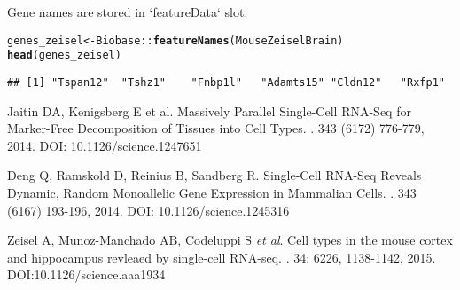 \documentclass[12pt]{article}\usepackage[]{graphicx}\usepackage[usenames,dvipsnames]{color}
\makeatletter
\newcommand{\hlopt}[1]{\textcolor[rgb]{0,0,0}{#1}}%
\newcommand{\hlstd}[1]{\textcolor[rgb]{0.345,0.345,0.345}{#1}}%
\newcommand{\hlkwb}[1]{\textcolor[rgb]{0.69,0.353,0.396}{#1}}%
\newcommand{\hlkwd}[1]{\textcolor[rgb]{0.737,0.353,0.396}{\textbf{#1}}}%
\newenvironment{kframe}{%
 \def\at@end@of@kframe{}%
 \ifinner\ifhmode%
  \def\at@end@of@kframe{\end{minipage}}%
  \begin{minipage}{\columnwidth}%
 \fi\fi%
 \def\FrameCommand##1{\hskip\@totalleftmargin \hskip-\fboxsep
 \colorbox{shadecolor}{##1}\hskip-\fboxsep
     \hskip-\linewidth \hskip-\@totalleftmargin \hskip\columnwidth}%
 \MakeFramed {\advance\hsize-\width
   \@totalleftmargin\z@ \linewidth\hsize
   \@setminipage}}%
 {\par\unskip\endMakeFramed%
 \at@end@of@kframe}
\newenvironment{knitrout}{}{} %
\makeatother
\begin{document}
Gene names are stored in `featureData` slot:

\begin{knitrout}
\color{fgcolor}\begin{kframe}
\begin{alltt}
\hlstd{genes_zeisel} \hlkwb{<-} \hlstd{Biobase}\hlopt{::}\hlkwd{featureNames}\hlstd{(MouseZeiselBrain)}
\hlkwd{head}\hlstd{(genes_zeisel)}
\end{alltt}
\begin{verbatim}
## [1] "Tspan12"  "Tshz1"    "Fnbp1l"   "Adamts15" "Cldn12"   "Rxfp1"
\end{verbatim}
\end{kframe}
\end{knitrout}


\begin{thebibliography}{1}

Jaitin DA,  Kenigsberg E et al.
\newblock Massively Parallel Single-Cell RNA-Seq for Marker-Free Decomposition
of Tissues into Cell Types.
. 343 (6172) 776-779, 2014. DOI: 10.1126/science.1247651

Deng Q,  Ramskold D,  Reinius B,  Sandberg R.
\newblock Single-Cell RNA-Seq Reveals Dynamic, Random Monoallelic Gene
Expression in Mammalian Cells.
.  343 (6167) 193-196, 2014. DOI: 10.1126/science.1245316

Zeisel A, Munoz-Manchado AB, Codeluppi S \textit{et al}.
\newblock Cell types in the mouse cortex and hippocampus revleaed by
single-cell RNA-seq.
.  34: 6226, 1138-1142, 2015. DOI:10.1126/science.aaa1934

\end{thebibliography}
\end{document}
